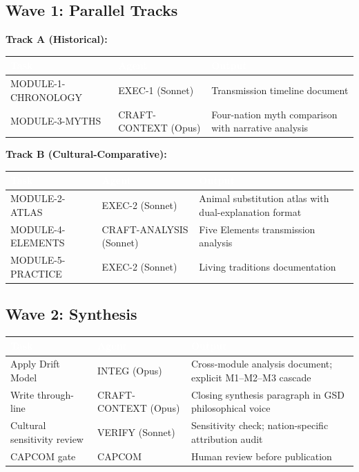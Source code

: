 \documentclass[11pt,letterpaper]{article}
\newcommand{\tableheader}[1]{\textbf{\sffamily\textcolor{white}{#1}}}
\begin{document}
\subsection{Wave 1: Parallel Tracks}

\textbf{Track A (Historical):}

\begin{center}
\begin{tabularx}{\textwidth}{L{3.5cm}L{2.5cm}X}
\toprule
{}
\tableheader{Task} & \tableheader{Agent} & \tableheader{Output} \\
\midrule
MODULE-1-CHRONOLOGY & EXEC-1 (Sonnet) & Transmission timeline document \\
MODULE-3-MYTHS & CRAFT-CONTEXT (Opus) & Four-nation myth comparison with narrative analysis \\
\bottomrule
\end{tabularx}
\end{center}

\textbf{Track B (Cultural-Comparative):}

\begin{center}
\begin{tabularx}{\textwidth}{L{3.5cm}L{2.5cm}X}
\toprule
{}
\tableheader{Task} & \tableheader{Agent} & \tableheader{Output} \\
\midrule
MODULE-2-ATLAS & EXEC-2 (Sonnet) & Animal substitution atlas with dual-explanation format \\
MODULE-4-ELEMENTS & CRAFT-ANALYSIS (Sonnet) & Five Elements transmission analysis \\
MODULE-5-PRACTICE & EXEC-2 (Sonnet) & Living traditions documentation \\
\bottomrule
\end{tabularx}
\end{center}

\subsection{Wave 2: Synthesis}

\begin{center}
\begin{tabularx}{\textwidth}{L{3.5cm}L{2.5cm}X}
\toprule
{}
\tableheader{Task} & \tableheader{Agent} & \tableheader{Output} \\
\midrule
Apply Drift Model & INTEG (Opus) & Cross-module analysis document; explicit M1--M2--M3 cascade \\
Write through-line & CRAFT-CONTEXT (Opus) & Closing synthesis paragraph in GSD philosophical voice \\
Cultural sensitivity review & VERIFY (Sonnet) & Sensitivity check; nation-specific attribution audit \\
CAPCOM gate & CAPCOM & Human review before publication \\
\bottomrule
\end{tabularx}
\end{center}
\end{document}
